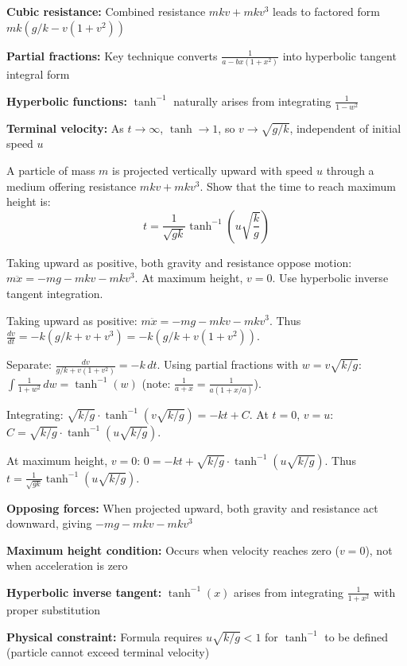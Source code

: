 \begin{takeaways}
\item \textbf{Cubic resistance:} Combined resistance $mkv + mkv^3$ leads to factored form $mk(g/k - v(1 + v^2))$
\item \textbf{Partial fractions:} Key technique converts $\frac{1}{a - bx(1+x^2)}$ into hyperbolic tangent integral form
\item \textbf{Hyperbolic functions:} $\tanh^{-1}$ naturally arises from integrating $\frac{1}{1-w^2}$
\item \textbf{Terminal velocity:} As $t \to \infty$, $\tanh \to 1$, so $v \to \sqrt{g/k}$, independent of initial speed $u$
\end{takeaways}

\begin{problem}
A particle of mass $m$ is projected vertically upward with speed $u$ through a medium offering resistance $mkv + mkv^3$. Show that the time to reach maximum height is:
\[
t = \frac{1}{\sqrt{gk}} \tanh^{-1}\left(u\sqrt{\frac{k}{g}}\right)
\]
\end{problem}

\begin{hint}
Taking upward as positive, both gravity and resistance oppose motion: $m\ddot{x} = -mg - mkv - mkv^3$. At maximum height, $v = 0$. Use hyperbolic inverse tangent integration.
\end{hint}

\begin{solution}
Taking upward as positive: $m\ddot{x} = -mg - mkv - mkv^3$. Thus $\frac{dv}{dt} = -k(g/k + v + v^3) = -k(g/k + v(1 + v^2))$.

Separate: $\frac{dv}{g/k + v(1 + v^2)} = -k\,dt$. Using partial fractions with $w = v\sqrt{k/g}$: $\int \frac{1}{1 + w^2}\,dw = \tanh^{-1}(w)$ (note: $\frac{1}{a + x} = \frac{1}{a(1 + x/a)}$).

Integrating: $\sqrt{k/g} \cdot \tanh^{-1}(v\sqrt{k/g}) = -kt + C$. At $t = 0$, $v = u$: $C = \sqrt{k/g} \cdot \tanh^{-1}(u\sqrt{k/g})$.

At maximum height, $v = 0$: $0 = -kt + \sqrt{k/g} \cdot \tanh^{-1}(u\sqrt{k/g})$. Thus $t = \frac{1}{\sqrt{gk}} \tanh^{-1}(u\sqrt{k/g})$.
\end{solution}

\begin{takeaways}
\item \textbf{Opposing forces:} When projected upward, both gravity and resistance act downward, giving $-mg - mkv - mkv^3$
\item \textbf{Maximum height condition:} Occurs when velocity reaches zero ($v = 0$), not when acceleration is zero
\item \textbf{Hyperbolic inverse tangent:} $\tanh^{-1}(x)$ arises from integrating $\frac{1}{1+x^2}$ with proper substitution
\item \textbf{Physical constraint:} Formula requires $u\sqrt{k/g} < 1$ for $\tanh^{-1}$ to be defined (particle cannot exceed terminal velocity)
\end{takeaways}

